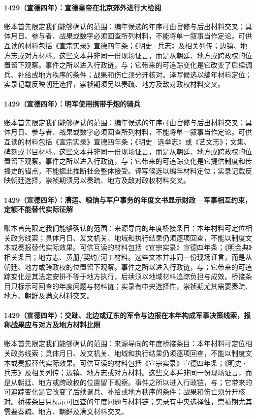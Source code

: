 \paragraph{1429（宣德四年）：宣德皇帝在北京郊外进行大检阅} 账本首先限定我们能够确认的范围：编年候选的年序可由官修与后出材料交叉；具体月日、参与者、战果或数字必须回查所列材料，不能将单一叙事当作定论。可供互读的材料包括《宣宗实录》宣德四年条；《明史·兵志》及相关列传；边镇、地方志或对方材料。这些文本并非同一份现场证言，而是从朝廷、地方或跨政权的位置留下观察。事件之所以进入行政链，与；它带来的可追踪变化是它改变了后续调兵、补给或地方秩序的条件；战果和伤亡须分开核对。译写候选以编年材料定位；实录记载反映朝廷选择，崇祯期须另以奏疏、地方及敌对政权材料交叉。

\paragraph{1429（宣德四年）：明军使用携带手炮的骑兵} 账本首先限定我们能够确认的范围：编年候选的年序可由官修与后出材料交叉；具体月日、参与者、战果或数字必须回查所列材料，不能将单一叙事当作定论。可供互读的材料包括《宣宗实录》宣德四年条；《明史·选举志》或《艺文志》；文集、碑刻或书目材料。这些文本并非同一份现场证言，而是从朝廷、地方或跨政权的位置留下观察。事件之所以进入行政链，与；它带来的可追踪变化是它提供制度和传播史的锚点，不能据此推断社会整体接受。译写候选以编年材料定位；实录记载反映朝廷选择，崇祯期须另以奏疏、地方及敌对政权材料交叉。

\paragraph{1429（宣德四年）：漕运、粮饷与军户事务的年度文书显示财政—军事相互约束，定额不能替代实际征解} 账本首先限定我们能够确认的范围：来源导向的年度桥接条目：本年材料可定位相关政务线索；具体月日、发文机关、地域和执行结果仍须逐项回查，不能以制度文本或奏报替代实际效果。可供互读的材料包括《宣宗实录》宣德四年条；《明会典》相关条目；地方志、黄册/契约/河工材料。这些文本并非同一份现场证言，而是从朝廷、地方或跨政权的位置留下观察。事件之所以进入行政链，与；它带来的可追踪变化是其法定安排不等于地方执行，后续须以地域材料追踪负担与成效。桥接条目只标示可回查的年度问题与材料链；实录有中央选择性，崇祯期尤其需要奏疏、地方、朝鲜及满文材料交叉。

\paragraph{1429（宣德四年）：交趾、北边或辽东的军令与边报在本年构成军事决策线索，报称战果应与对方及地方材料比照} 账本首先限定我们能够确认的范围：来源导向的年度桥接条目：本年材料可定位相关政务线索；具体月日、发文机关、地域和执行结果仍须逐项回查，不能以制度文本或奏报替代实际效果。可供互读的材料包括《宣宗实录》宣德四年条；《明史·兵志》及相关列传；边镇、地方志或对方材料。这些文本并非同一份现场证言，而是从朝廷、地方或跨政权的位置留下观察。事件之所以进入行政链，与；它带来的可追踪变化是它改变了后续调兵、补给或地方秩序的条件；战果和伤亡须分开核对。桥接条目只标示可回查的年度问题与材料链；实录有中央选择性，崇祯期尤其需要奏疏、地方、朝鲜及满文材料交叉。

